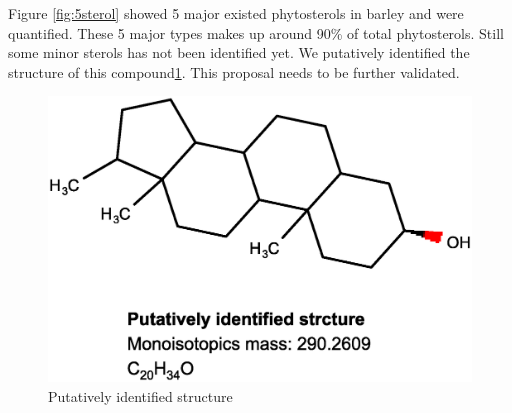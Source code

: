 Figure \ref{fig:5sterol} showed 5 major existed phytosterols in barley and were quantified\cite{sterol}. These 5 major types makes up around 90\% of total phytosterols\cite{sterol}. Still some minor sterols has not been identified yet.
We putatively identified the structure of this compound\ref{fig:putativesterol}. This proposal needs to be further validated.

\begin{figure}[H]
    \centering
    \includegraphics[scale=0.3]{images/possiblesterol.eps}
    \caption{Putatively identified structure}
    \label{fig:putativesterol}
\end{figure}